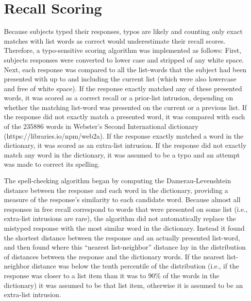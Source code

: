 \documentclass[man,natbib,floatsintext]{apa6} %
\begin{document}
\section{Recall Scoring}
Because subjects typed their responses, typos are likely and counting only exact matches with list words as correct would underestimate their recall scores. Therefore, a typo-sensitive scoring algorithm was implemented as follows: First, subjects responses were converted to lower case and stripped of any white space. Next, each response was compared to all the list-words that the subject had been presented with up to and including the current list (which were also lowercase and free of white space). If the response exactly matched any of these presented words, it was scored as a correct recall or a prior-list intrusion, depending on whether the matching list-word was presented on the current or a previous list. If the response did not exactly match a presented word, it was compared with each of the 235886 words in Webster's Second International dictionary (https://libraries.io/npm/web2a). If the response exactly matched a word in the dictionary, it was scored as an extra-list intrusion. If the response did not exactly match any word in the dictionary, it was assumed to be a typo and an attempt was made to correct its spelling.

The spell-checking algorithm began by computing the Damerau-Levenshtein distance \citep{Dame64} between the response and each word in the dictionary, providing a measure of the response's similarity to each candidate word. Because almost all responses in free recall correspond to words that were presented on some list (i.e., extra-list intrusions are rare), the algorithm did not automatically replace the mistyped response with the most similar word in the dictionary. Instead it found the shortest distance between the response and an actually presented list-word, and then found where this ``nearest list-neighbor'' distance lay in the distribution of distances between the response and the dictionary words. If the nearest list-neighbor distance was below the tenth percentile of the distribution (i.e., if the response was closer to a list item than it was to 90\% of the words in the dictionary) it was assumed to be that list item, otherwise it is assumed to be an extra-list intrusion.



\end{document}
